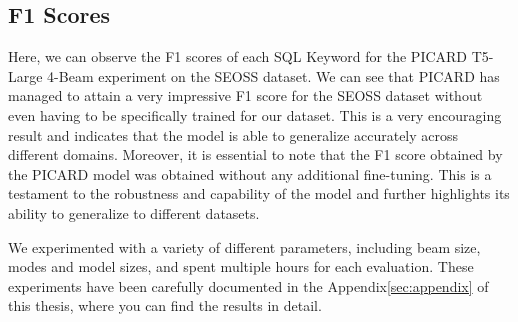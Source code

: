 \subsection{F1 Scores}

Here, we can observe the F1 scores of each SQL Keyword for the PICARD T5-Large 4-Beam experiment on the SEOSS dataset. We can see that PICARD has managed to attain a very impressive F1 score for the SEOSS dataset without even having to be specifically trained for our dataset. This is a very encouraging result and indicates that the model is able to generalize accurately across different domains. Moreover, it is essential to note that the F1 score obtained by the PICARD model was obtained without any additional fine-tuning. This is a testament to the robustness and capability of the model and further highlights its ability to generalize to different datasets.

We experimented with a variety of different parameters, including beam size, modes and model sizes, and spent multiple hours for each evaluation. These experiments have been carefully documented in the Appendix\ref{sec:appendix} of this thesis, where you can find the results in detail.



